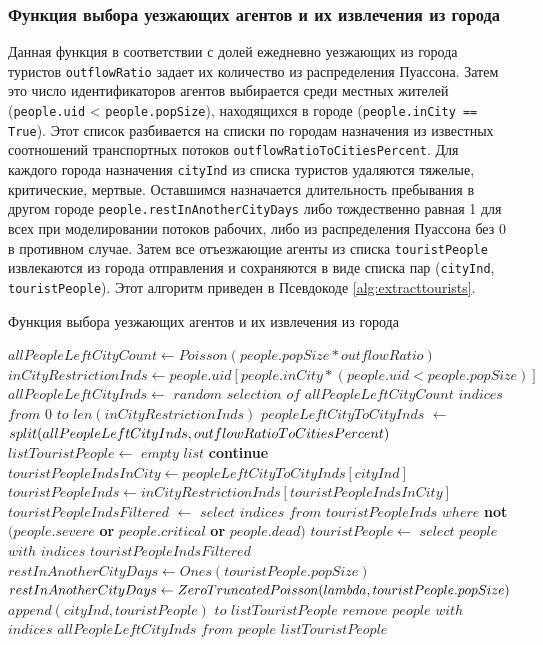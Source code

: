 \documentclass[a4paper,12pt]{article} %
\begin{document}
\subsubsection{Функция выбора уезжающих агентов и их извлечения из города}
Данная функция в соответствии с долей ежедневно уезжающих из города туристов \texttt{outflowRatio} задает их количество из распределения Пуассона. Затем это число идентификаторов агентов выбирается среди местных жителей (\texttt{people.uid} < \texttt{people.pop\-Size}), находящихся в городе (\texttt{people.inCity == True}). Этот список разбивается на списки по городам назначения из известных соотношений транспортных потоков \texttt{outflow\-RatioToCitiesPercent}. Для каждого города назначения \texttt{cityInd} из списка туристов удаляются тяжелые, критические, мертвые. Оставшимся назначается длительность пребывания в другом городе \texttt{people.restInAnotherCityDays} либо тождественно равная 1 для всех при моделировании потоков рабочих, либо из распределения Пуассона без 0 в противном случае. Затем все отъезжающие агенты из списка \texttt{touristPeople} извлекаются из города отправления и сохраняются в виде списка пар (\texttt{cityInd}, \texttt{touristPeople}). Этот алгоритм приведен в Псевдокоде \ref{alg:extracttourists}.

\begin{algorithm}[h]
\caption{Функция выбора уезжающих агентов и их извлечения из города}
\label{alg:extracttourists}
\begin{algorithmic}[1]
	\State \( allPeopleLeftCityCount \gets Poisson(people.popSize * outflowRatio) \)
	\State \( inCityRestrictionInds \gets people.uid[people.inCity * (people.uid < people.popSize)]\)
	\State \( allPeopleLeftCityInds \gets \) \(random\) \(selection\) \(of\) \(allPeopleLeftCityCount\) \(indices\) \(from\) \(0\) \(to\) \(len(inCityRestrictionInds)\)
	\State \( peopleLeftCityToCityInds \) \(\gets\) \(split(allPeopleLeftCityInds,outflowRatioToCities\-Percent) \)
	\State \( listTouristPeople \gets\) \(empty\) \(list \)
			\State \textbf{continue}
		\EndIf
		\State \( touristPeopleIndsInCity \gets peopleLeftCityToCityInds[cityInd] \)
		\State \( touristPeopleInds \gets inCityRestrictionInds[touristPeopleIndsInCity] \)
		\State \( touristPeopleIndsFiltered\) \( \gets \) \( select \) \( indices \) \( from \) \( touristPeopleInds \) \( where \) \textbf{not} \( (people.severe \) \textbf{or} \( people.critical \) \textbf{or} \( people.dead) \)
		\State \( touristPeople \gets \) \(select\) \(people\) \(with\) \(indices\) \(touristPeopleIndsFiltered \)
			\State \( restInAnotherCityDays \gets Ones(touristPeople.popSize) \)
		\Else
			\State \( restInAnotherCityDays \gets ZeroTruncatedPoisson(lambda, touristPeople.pop\-Size) \)
		\EndIf
		\State \( append(cityInd, touristPeople) \) \(to\) \(listTouristPeople \)
	\EndFor
	\State \(remove\) \(people\) \(with\) \(indices\) \(allPeopleLeftCityInds\) \(from\) \(people \)
	\State \Return \( listTouristPeople \)	
\EndFunction	
\end{algorithmic}
\end{algorithm}
\end{document}

